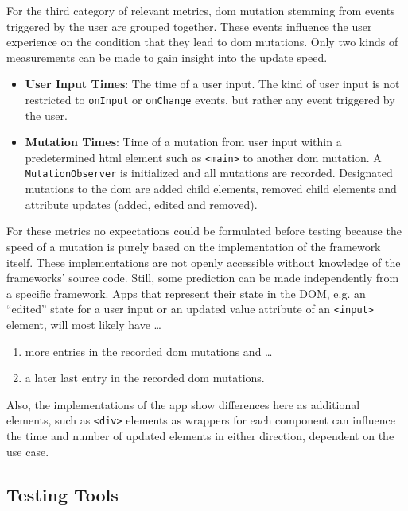 \documentclass[a4paper, 12pt]{article}
\begin{document}
For the third category of relevant metrics, \acrshort{dom} mutation stemming from events triggered by the user are grouped together.
These events influence the user experience on the condition that they lead to \acrshort{dom} mutations.
Only two kinds of measurements can be made to gain insight into the update speed.

\begin{itemize}
  \item \textbf{User Input Times}: The time of a user input.
  The kind of user input is not restricted to \verb|onInput| or \verb|onChange| events, but rather any event triggered by the user.
  \item \textbf{Mutation Times}: Time of a mutation from user input within a predetermined \acrshort{html} element such as \verb|<main>| to another \acrshort{dom} mutation.
  A \verb|MutationObserver| is initialized and all mutations are recorded. Designated mutations to the \acrshort{dom} are added child elements, removed child elements and attribute updates (added, edited and removed).
\end{itemize}

For these metrics no expectations could be formulated before testing because the speed of a mutation is purely based on the implementation of the framework itself.
These implementations are not openly accessible without knowledge of the frameworks' source code.
Still, some prediction can be made independently from a specific framework.
Apps that represent their state in the DOM, e.g. an \enquote{edited} state for a user input or an updated value attribute of an \verb|<input>| element, will most likely have \dots

\begin{enumerate}
  \item more entries in the recorded \acrshort{dom} mutations and \dots
  \item a later last entry in the recorded \acrshort{dom} mutations.
\end{enumerate}

Also, the implementations of the app show differences here as additional elements, such as \verb|<div>| elements as wrappers for each component can influence the time and number of updated elements in either direction, dependent on the use case.

\subsection{Testing Tools}\label{subsec:testingtools}
% 
% 
\end{document}
